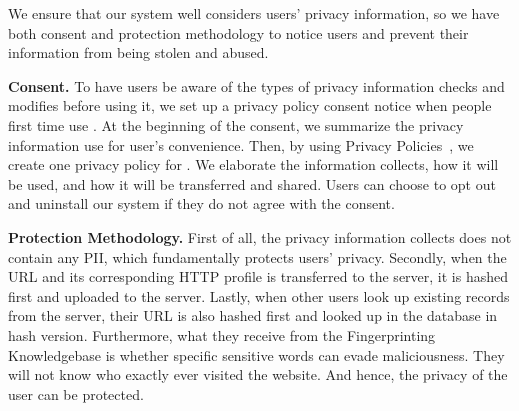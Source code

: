 We ensure that our \spartacus system well considers users' privacy information,
so we have both consent and protection methodology to notice users and prevent their information from being stolen and abused.

\noindent
\textbf{Consent.}
To have users be aware of the types of privacy information \spartacus checks and modifies before using it,
we set up a privacy policy consent notice when people first time use \spartacus.
At the beginning of the consent, we summarize the privacy information \spartacus use for user's convenience.
Then, by using Privacy Policies~\cite{privacypolicy}, we create one privacy policy for \spartacus.
We elaborate the information \spartacus collects, how it will be used, and how it will be transferred and shared.
Users can choose to opt out and uninstall our system if they do not agree with the consent.

\noindent
\textbf{Protection Methodology.}
First of all, the privacy information \spartacus collects does not contain any PII, which fundamentally protects users' privacy.
Secondly, when the URL and its corresponding HTTP profile is transferred to the server,
it is hashed first and uploaded to the server.
Lastly, when other users look up existing records from the server,
their URL is also hashed first and looked up in the database in hash version.
Furthermore, what they receive from the Fingerprinting Knowledgebase is whether specific sensitive words can evade maliciousness.
They will not know who exactly ever visited the website.
And hence, the privacy of the user can be protected.